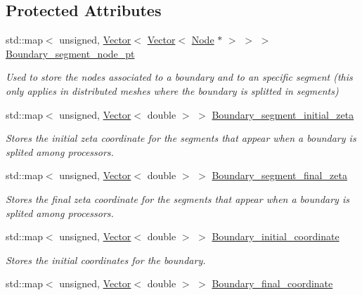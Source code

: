 \subsection*{Protected Attributes}
\begin{DoxyCompactItemize}
\item 
std\+::map$<$ unsigned, \hyperlink{classoomph_1_1Vector}{Vector}$<$ \hyperlink{classoomph_1_1Vector}{Vector}$<$ \hyperlink{classoomph_1_1Node}{Node} $\ast$ $>$ $>$ $>$ \hyperlink{classoomph_1_1UnstructuredTwoDMeshGeometryBase_ad32540548b45899b632136726d85721c}{Boundary\+\_\+segment\+\_\+node\+\_\+pt}
\begin{DoxyCompactList}\small\item\em Used to store the nodes associated to a boundary and to an specific segment (this only applies in distributed meshes where the boundary is splitted in segments) \end{DoxyCompactList}\item 
std\+::map$<$ unsigned, \hyperlink{classoomph_1_1Vector}{Vector}$<$ double $>$ $>$ \hyperlink{classoomph_1_1UnstructuredTwoDMeshGeometryBase_a758438ca379cd0922b0b5ebf4f52bb5f}{Boundary\+\_\+segment\+\_\+initial\+\_\+zeta}
\begin{DoxyCompactList}\small\item\em Stores the initial zeta coordinate for the segments that appear when a boundary is splited among processors. \end{DoxyCompactList}\item 
std\+::map$<$ unsigned, \hyperlink{classoomph_1_1Vector}{Vector}$<$ double $>$ $>$ \hyperlink{classoomph_1_1UnstructuredTwoDMeshGeometryBase_ac49ab6620bdbd45c8ea57139e35c0043}{Boundary\+\_\+segment\+\_\+final\+\_\+zeta}
\begin{DoxyCompactList}\small\item\em Stores the final zeta coordinate for the segments that appear when a boundary is splited among processors. \end{DoxyCompactList}\item 
std\+::map$<$ unsigned, \hyperlink{classoomph_1_1Vector}{Vector}$<$ double $>$ $>$ \hyperlink{classoomph_1_1UnstructuredTwoDMeshGeometryBase_a4ad531467bdd7f379902a81d9eaa9e3e}{Boundary\+\_\+initial\+\_\+coordinate}
\begin{DoxyCompactList}\small\item\em Stores the initial coordinates for the boundary. \end{DoxyCompactList}\item 
std\+::map$<$ unsigned, \hyperlink{classoomph_1_1Vector}{Vector}$<$ double $>$ $>$ \hyperlink{classoomph_1_1UnstructuredTwoDMeshGeometryBase_a1753fbd79a4a982ab4ab0f5b276404f2}{Boundary\+\_\+final\+\_\+coordinate}

\end{DoxyCompactItemize}
